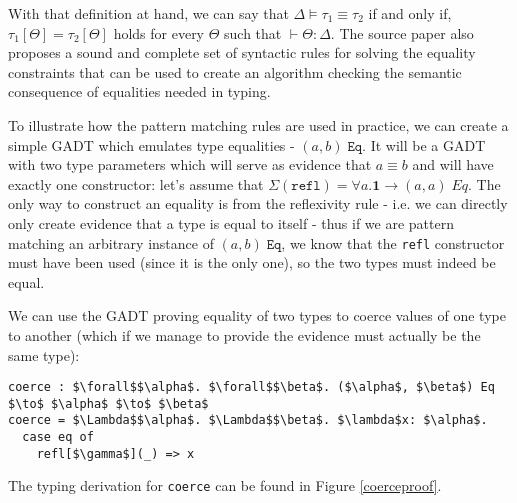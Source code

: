 With that definition at hand, we can say that $\Delta \vDash \tau_1 \equiv \tau_2$ if and only if, $\tau_1[\Theta] = \tau_2[\Theta]$ holds for every $\Theta$ such that $\vdash \Theta : \Delta$. The source paper \cite{XiGRDT} also proposes a sound and complete set of syntactic rules for solving the equality constraints that can be used to create an algorithm checking the semantic consequence of equalities needed in typing.

To illustrate how the pattern matching rules are used in practice, we can create a simple GADT which emulates type equalities - $(a, b) \; \texttt{Eq}$. It will be a GADT with two type parameters which will serve as evidence that $a \equiv b$ and will have exactly one constructor: let's assume that $\Sigma(\texttt{refl}) = \forall a. \mathbf{1} \to (a, a) \; Eq$. The only way to construct an equality is from the reflexivity rule - i.e. we can directly only create evidence that a type is equal to itself - thus if we are pattern matching an arbitrary instance of $(a, b) \; \texttt{Eq}$, we know that the \texttt{refl} constructor must have been used (since it is the only one), so the two types must indeed be equal.

We can use the GADT proving equality of two types to coerce values of one type to another (which if we manage to provide the evidence must actually be the same type):
\begin{lstlisting}[mathescape=true, basicstyle=\ttfamily]
coerce : $\forall$$\alpha$. $\forall$$\beta$. ($\alpha$, $\beta$) Eq $\to$ $\alpha$ $\to$ $\beta$
coerce = $\Lambda$$\alpha$. $\Lambda$$\beta$. $\lambda$x: $\alpha$.
  case eq of
    refl[$\gamma$](_) => x
\end{lstlisting}

The typing derivation for \texttt{coerce} can be found in Figure \ref{coerceproof}.

